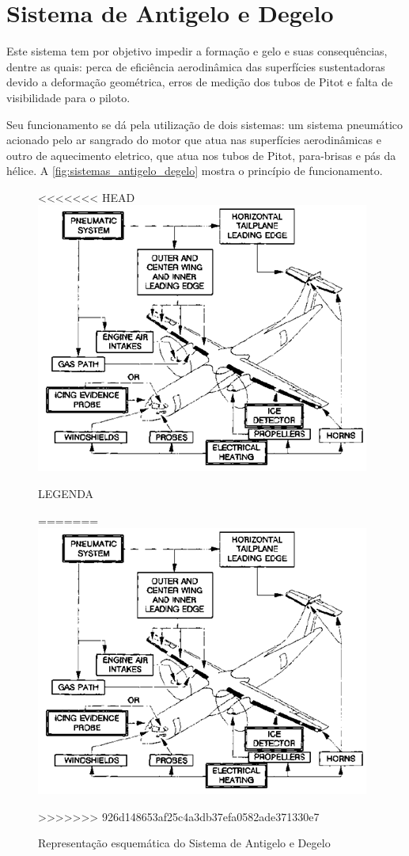 \section{Sistema de Antigelo e Degelo}

Este sistema tem por objetivo impedir a formação e gelo e suas consequências, dentre as quais: perca de eficiência aerodinâmica das superfícies sustentadoras devido a deformação geométrica, erros de medição dos tubos de Pitot e falta de visibilidade para o piloto.

Seu funcionamento se dá pela utilização de dois sistemas: um sistema pneumático acionado pelo ar sangrado do motor que atua nas superfícies aerodinâmicas e outro de aquecimento eletrico, que atua nos tubos de Pitot, para-brisas e pás da hélice.
A \autoref{fig:sistemas_antigelo_degelo} mostra o princípio de funcionamento.

\begin{figure}
<<<<<<< HEAD
\centering
\includegraphics{images/parte3/sistemas_antigelo_degelo.png}
\caption{LEGENDA}
=======
\includegraphics[width=\textwidth]{images/parte3/sistemas_antigelo_degelo.png}
\caption{Representação esquemática do Sistema de Antigelo e Degelo}
>>>>>>> 926d148653af25c4a3db37efa0582ade371330e7
\label{fig:sistemas_antigelo_degelo}
\end{figure}


